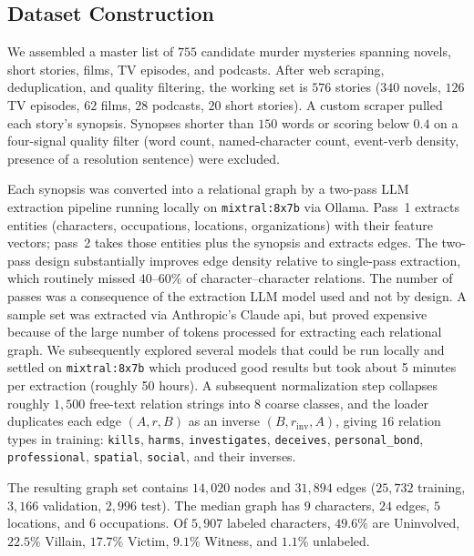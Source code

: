 \documentclass[11pt]{article}
\begin{document}
\subsection{Dataset Construction}
We assembled a master list of $755$ candidate murder mysteries spanning novels, short stories, films, TV episodes, and podcasts. After web scraping, deduplication, and quality filtering, the working set is $576$ stories ($340$ novels, $126$ TV episodes, $62$ films, $28$ podcasts, $20$ short stories). A custom scraper pulled each story's synopsis. Synopses shorter than $150$ words or scoring below $0.4$ on a four-signal quality filter (word count, named-character count, event-verb density, presence of a resolution sentence) were excluded.

Each synopsis was converted into a relational graph by a two-pass LLM extraction pipeline running locally on \texttt{mixtral:8x7b} via Ollama. Pass~1 extracts entities (characters, occupations, locations, organizations) with their feature vectors; pass~2 takes those entities plus the synopsis and extracts edges. The two-pass design substantially improves edge density relative to single-pass extraction, which routinely missed $40$--$60\%$ of character--character relations. The number of passes was a consequence of the extraction LLM model used and not by design. A sample set was extracted via Anthropic's Claude api, but proved expensive because of the large number of tokens processed for extracting each relational graph. We subsequently explored several models that could be run locally and settled on \texttt{mixtral:8x7b} which produced good results but took about 5 minutes per extraction (roughly 50 hours).    A subsequent normalization step collapses roughly $1{,}500$ free-text relation strings into $8$ coarse classes, and the loader duplicates each edge $(A, r, B)$ as an inverse $(B, r_{\text{inv}}, A)$, giving $16$ relation types in training: \texttt{kills}, \texttt{harms}, \texttt{investigates}, \texttt{deceives}, \texttt{personal\_bond}, \texttt{professional}, \texttt{spatial}, \texttt{social}, and their inverses.

The resulting graph set contains $14{,}020$ nodes and $31{,}894$ edges ($25{,}732$ training, $3{,}166$ validation, $2{,}996$ test). The median graph has $9$ characters, $24$ edges, $5$ locations, and $6$ occupations. Of $5{,}907$ labeled characters, $49.6\%$ are Uninvolved, $22.5\%$ Villain, $17.7\%$ Victim, $9.1\%$ Witness, and $1.1\%$ unlabeled.
\end{document}
